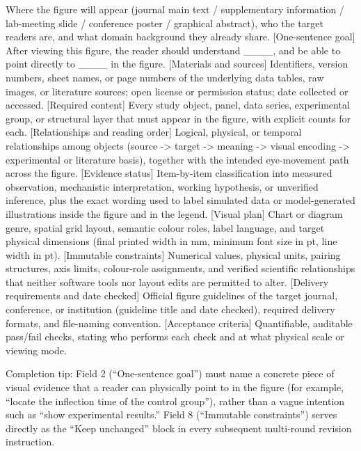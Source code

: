 \begin{Prompt}
 Where the figure will appear (journal main text / supplementary information / lab-meeting slide / conference poster / graphical abstract), who the target readers are, and what domain background they already share.
[One-sentence goal] After viewing this figure, the reader should understand ____, and be able to point directly to ____ in the figure.
[Materials and sources] Identifiers, version numbers, sheet names, or page numbers of the underlying data tables, raw images, or literature sources; open license or permission status; date collected or accessed.
[Required content] Every study object, panel, data series, experimental group, or structural layer that must appear in the figure, with explicit counts for each.
[Relationships and reading order] Logical, physical, or temporal relationships among objects (source -> target -> meaning -> visual encoding -> experimental or literature basis), together with the intended eye-movement path across the figure.
[Evidence status] Item-by-item classification into measured observation, mechanistic interpretation, working hypothesis, or unverified inference, plus the exact wording used to label simulated data or model-generated illustrations inside the figure and in the legend.
[Visual plan] Chart or diagram genre, spatial grid layout, semantic colour roles, label language, and target physical dimensions (final printed width in mm, minimum font size in pt, line width in pt).
[Immutable constraints] Numerical values, physical units, pairing structures, axis limits, colour-role assignments, and verified scientific relationships that neither software tools nor layout edits are permitted to alter.
[Delivery requirements and date checked] Official figure guidelines of the target journal, conference, or institution (guideline title and date checked), required delivery formats, and file-naming convention.
[Acceptance criteria] Quantifiable, auditable pass/fail checks, stating who performs each check and at what physical scale or viewing mode.
\end{Prompt}

\begin{BookNote}
Completion tip: Field 2 (``One-sentence goal'') must name a concrete piece of visual evidence that a reader can physically point to in the figure (for example, ``locate the inflection time of the control group''), rather than a vague intention such as ``show experimental results.'' Field 8 (``Immutable constraints'') serves directly as the ``Keep unchanged'' block in every subsequent multi-round revision instruction.
\end{BookNote}

